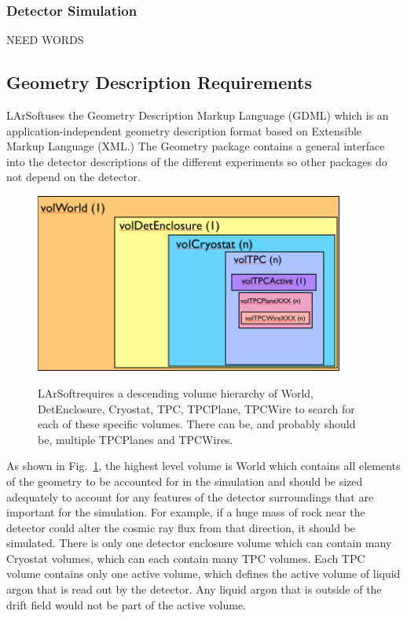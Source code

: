 \documentclass[12pt]{elsarticle}
\newcommand{\larsoft}{LArSoft}
\begin{document}
\subsubsection{Detector Simulation}
NEED WORDS

\subsection{Geometry Description Requirements}
\label{sec-geom-desc}
\larsoft uses the Geometry Description Markup Language (GDML) which is an application-independent geometry description format based on Extensible Markup Language (XML.) 
The Geometry package contains a general interface into the detector descriptions of the different experiments so other packages do not depend on the detector. 

\begin{figure}[h]
\center
\caption{\larsoft requires a descending volume hierarchy of World, DetEnclosure, Cryostat, TPC, TPCPlane, TPCWire to search for each of these specific volumes. There can be, and probably should be, multiple TPCPlanes and TPCWires.}
\includegraphics[width=4.0in]{./imgs/geometry_volumes.png}
\label{geo-vol.img}
\end{figure}

As shown in Fig.~\ref{geo-vol.img},
the highest level volume is World which contains all elements of the geometry to be accounted for in the simulation and should be sized adequately to account for any features of the detector surroundings that are important for the simulation. For example, if a huge mass of rock near the detector could alter the cosmic ray flux from that direction, it should be simulated. There is only one detector enclosure volume which can contain many Cryostat volumes, which can each contain many TPC volumes. Each TPC volume contains only one active volume, which defines the active volume of liquid argon that is read out by the detector. Any liquid argon that is outside of the drift field would not be part of the active volume. 
\end{document}
